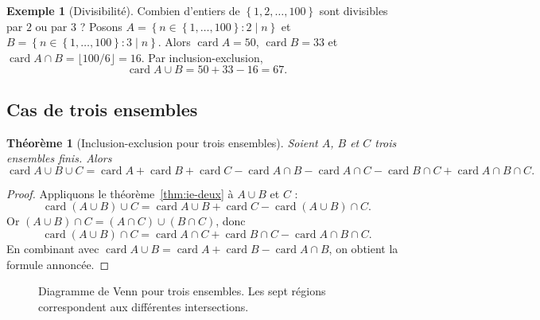 \documentclass[12pt,a4paper,openany]{book}
\theoremstyle{definition}
\newtheorem{exemple}[definition]{Exemple}
\theoremstyle{plain}
\newtheorem{theoreme}[definition]{Théorème}
\theoremstyle{remark}
\newcommand{\set}[1]{\left\{#1\right\}}
\DeclareMathOperator{\card}{card}
\begin{document}
\begin{exemple}[Divisibilité]
\label{ex:ie-div}
Combien d'entiers de $\set{1,2,\dots,100}$ sont divisibles par $2$ ou par $3$ ?
Posons $A = \set{n \in \set{1,\dots,100} : 2 \mid n}$ et
$B = \set{n \in \set{1,\dots,100} : 3 \mid n}$.
Alors $\card{A} = 50$, $\card{B} = 33$ et $\card{A \cap B} = \lfloor 100/6 \rfloor = 16$.
Par inclusion-exclusion,
\[
  \card{A \cup B} = 50 + 33 - 16 = 67.
\]
\end{exemple}

\subsection{Cas de trois ensembles}

\begin{theoreme}[Inclusion-exclusion pour trois ensembles]
\label{thm:ie-trois}
Soient $A$, $B$ et $C$ trois ensembles finis. Alors
\[
  \card{A \cup B \cup C}
    = \card{A} + \card{B} + \card{C}
    - \card{A \cap B} - \card{A \cap C} - \card{B \cap C}
    + \card{A \cap B \cap C}.
\]
\end{theoreme}

\begin{proof}
Appliquons le théorème~\ref{thm:ie-deux} à $A \cup B$ et $C$ :
\[
  \card{(A \cup B) \cup C}
    = \card{A \cup B} + \card{C} - \card{(A \cup B) \cap C}.
\]
Or $(A \cup B) \cap C = (A \cap C) \cup (B \cap C)$, donc
\[
  \card{(A \cup B) \cap C}
    = \card{A \cap C} + \card{B \cap C} - \card{A \cap B \cap C}.
\]
En combinant avec $\card{A \cup B} = \card{A} + \card{B} - \card{A \cap B}$,
on obtient la formule annoncée.
\end{proof}

\begin{figure}[ht]
\centering
{}
\caption{Diagramme de Venn pour trois ensembles. Les sept régions correspondent
aux différentes intersections.}
\label{fig:venn-trois}
\end{figure}
\end{document}
